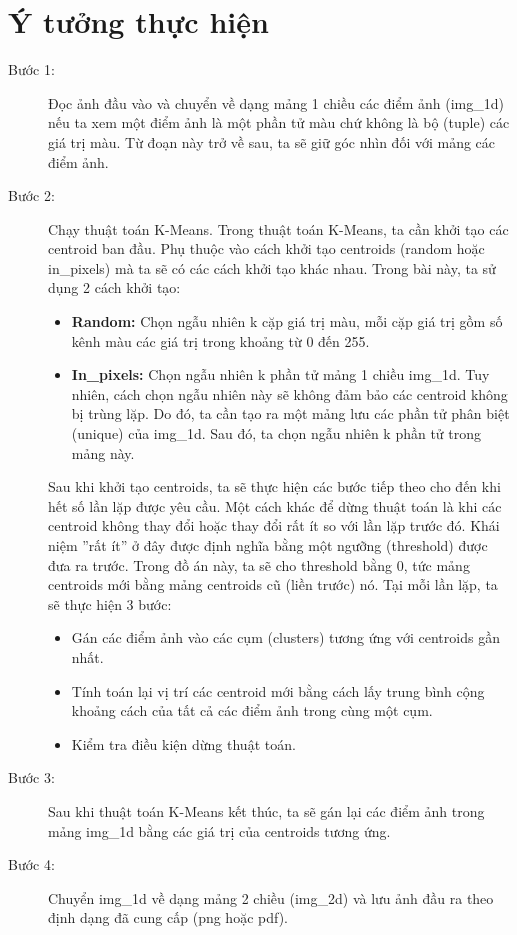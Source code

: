 \documentclass{article}
\begin{document}
\section{Ý tưởng thực hiện}
\begin{description}
  \item[Bước 1: ] \label{view} Đọc ảnh đầu vào và chuyển về dạng mảng 1 chiều các điểm ảnh (img\_1d) nếu ta xem một điểm ảnh là một phần tử màu chứ không là bộ (tuple) các giá trị màu. Từ đoạn này trở về sau, ta sẽ giữ góc nhìn đối với mảng các điểm ảnh.
  \item[Bước 2: ] Chạy thuật toán K-Means. Trong thuật toán K-Means, ta cần khởi tạo các centroid ban đầu. Phụ thuộc vào cách khởi tạo centroids (random hoặc in\_pixels) mà ta sẽ có các cách khởi tạo khác nhau. Trong bài này, ta sử dụng 2 cách khởi tạo:
  \begin{itemize}
    \item \textbf{Random:} Chọn ngẫu nhiên k cặp giá trị màu, mỗi cặp giá trị gồm số kênh màu các giá trị trong khoảng từ 0 đến 255.
    \item \textbf{In\_pixels:} Chọn ngẫu nhiên k phần tử mảng 1 chiều img\_1d. Tuy nhiên, cách chọn ngẫu nhiên này sẽ không đảm bảo các centroid không bị trùng lặp. Do đó, ta cần tạo ra một mảng lưu các phần tử phân biệt (unique) của img\_1d. Sau đó, ta chọn ngẫu nhiên k phần tử trong mảng này.
  \end{itemize}
  Sau khi khởi tạo centroids, ta sẽ thực hiện các bước tiếp theo cho đến khi hết số lần lặp được yêu cầu. Một cách khác để dừng thuật toán là khi các centroid không thay đổi hoặc thay đổi rất ít so với lần lặp trước đó. Khái niệm ''rất ít'' ở đây được định nghĩa bằng một ngưỡng (threshold) được đưa ra trước. Trong đồ án này, ta sẽ cho threshold bằng 0, tức mảng centroids mới bằng mảng centroids cũ (liền trước) nó. Tại mỗi lần lặp, ta sẽ thực hiện 3 bước:
  \begin{itemize}
    \item Gán các điểm ảnh vào các cụm (clusters) tương ứng với centroids gần nhất.
    \item Tính toán lại vị trí các centroid mới bằng cách lấy trung bình cộng khoảng cách của tất cả các điểm ảnh trong cùng một cụm.
    \item Kiểm tra điều kiện dừng thuật toán.
  \end{itemize}
  \item[Bước 3: ] Sau khi thuật toán K-Means kết thúc, ta sẽ gán lại các điểm ảnh trong mảng img\_1d bằng các giá trị của centroids tương ứng.
  \item[Bước 4: ] Chuyển img\_1d về dạng mảng 2 chiều (img\_2d) và lưu ảnh đầu ra theo định dạng đã cung cấp (png hoặc pdf).
\end{description}
\end{document}
